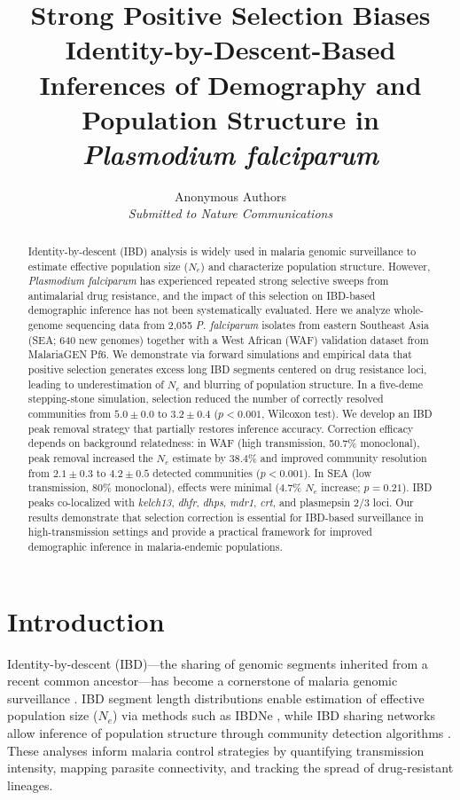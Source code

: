 \documentclass[11pt]{article}
\title{Strong Positive Selection Biases Identity-by-Descent-Based Inferences of Demography and Population Structure in \textit{Plasmodium falciparum}}
\author{
  Anonymous Authors\\
  \textit{Submitted to Nature Communications}
}
\date{}
\begin{document}
\maketitle

\begin{abstract}
Identity-by-descent (IBD) analysis is widely used in malaria genomic surveillance to estimate effective population size ($N_e$) and characterize population structure. However, \textit{Plasmodium falciparum} has experienced repeated strong selective sweeps from antimalarial drug resistance, and the impact of this selection on IBD-based demographic inference has not been systematically evaluated. Here we analyze whole-genome sequencing data from 2,055 \textit{P. falciparum} isolates from eastern Southeast Asia (SEA; 640 new genomes) together with a West African (WAF) validation dataset from MalariaGEN Pf6. We demonstrate via forward simulations and empirical data that positive selection generates excess long IBD segments centered on drug resistance loci, leading to underestimation of $N_e$ and blurring of population structure. In a five-deme stepping-stone simulation, selection reduced the number of correctly resolved communities from $5.0 \pm 0.0$ to $3.2 \pm 0.4$ ($p < 0.001$, Wilcoxon test). We develop an IBD peak removal strategy that partially restores inference accuracy. Correction efficacy depends on background relatedness: in WAF (high transmission, 50.7\% monoclonal), peak removal increased the $N_e$ estimate by 38.4\% and improved community resolution from $2.1 \pm 0.3$ to $4.2 \pm 0.5$ detected communities ($p < 0.001$). In SEA (low transmission, 80\% monoclonal), effects were minimal (4.7\% $N_e$ increase; $p = 0.21$). IBD peaks co-localized with \textit{kelch13}, \textit{dhfr}, \textit{dhps}, \textit{mdr1}, \textit{crt}, and plasmepsin 2/3 loci. Our results demonstrate that selection correction is essential for IBD-based surveillance in high-transmission settings and provide a practical framework for improved demographic inference in malaria-endemic populations.
\end{abstract}

\section{Introduction}

Identity-by-descent (IBD)---the sharing of genomic segments inherited from a recent common ancestor---has become a cornerstone of malaria genomic surveillance \citep{taylor2017quantifying, daniels2015genome, wesolowski2018mapping}. IBD segment length distributions enable estimation of effective population size ($N_e$) via methods such as IBDNe \citep{browning2015accurate}, while IBD sharing networks allow inference of population structure through community detection algorithms \citep{taylor2017quantifying, henden2018identity}. These analyses inform malaria control strategies by quantifying transmission intensity, mapping parasite connectivity, and tracking the spread of drug-resistant lineages.
\end{document}

